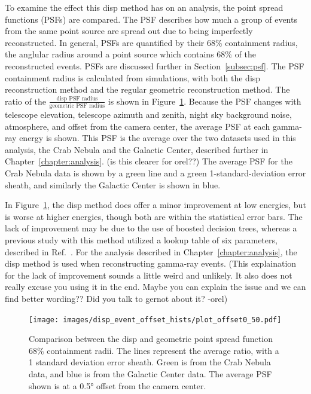 To examine the effect this disp method has on an analysis, the point spread functions (PSFs) are compared.
The PSF describes how much a group of events from the same point source are spread out due to being imperfectly reconstructed.
In general, PSFs are quantified by their 68\% containment radius, the anglular radius around a point source which contains 68\% of the reconstructed events.
PSFs are discussed further in Section~\ref{subsec:psf}.
The PSF containment radius is calculated from simulations, with both the disp reconstruction method and the regular geometric reconstruction method.
The ratio of the $\frac{\textrm{disp PSF radius}}{\textrm{geometric PSF radius}}$ is shown in Figure~\ref{fig:disp_psf_comparison}.
Because the PSF changes with telescope elevation, telescope azimuth and zenith, night sky background noise, atmosphere, and offset from the camera center, the average PSF at each gamma-ray energy is shown.
This PSF is the average over the two datasets used in this analysis, the Crab Nebula and the Galactic Center, described further in Chapter~\ref{chapter:analysis}.
{\color{red}(is this clearer for orel??)}
The average PSF for the Crab Nebula data is shown by a green line and a green 1-standard-deviation error sheath, and similarly the Galactic Center is shown in blue.
    
In Figure~\ref{fig:disp_psf_comparison}, the disp method does offer a minor improvement at low energies, but is worse at higher energies, though both are within the statistical error bars.
The lack of improvement may be due to the use of boosted decision trees, whereas a previous study with this method utilized a lookup table of six parameters, described in Ref.~\cite{Beilicke2012NIM}.
For the analysis described in Chapter~\ref{chapter:analysis}, the disp method is used when reconstructing gamma-ray events.
{\color{red}(This explaination for the lack of improvement sounds a little weird and unlikely.  It also does not really excuse you using it in the end. Maybe you can explain the issue and we can find better wording?? Did you talk to gernot about it? -orel)}
    
\begin{figure}[b]
  \centering
  \texttt{[image: images/disp\_event\_offset\_hists/plot\_offset0\_50.pdf]}
  \caption[DISP Point Spread Function Comparison]{
    Comparison between the disp and geometric point spread function 68\% containment radii.
    The lines represent the average ratio, with a 1 standard deviation error sheath.
    Green is from the Crab Nebula data, and blue is from the Galactic Center data.
    The average PSF shown is at a \ang{0.5} offset from the camera center.
  }
  \label{fig:disp_psf_comparison}
\end{figure}

